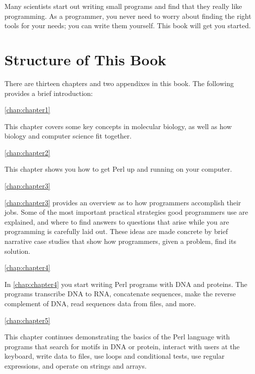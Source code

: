 Many scientists start out writing small programs and find that they really like programming. As a programmer, you never need to worry about finding the right tools for your needs; you can write them yourself. This book will get you started.

\section*{Structure of This Book}
There are thirteen chapters and two appendixes in this book. The following provides a brief introduction:

\autoref{chap:chapter1}
\begin{adjustwidth}{1cm}{0cm}
This chapter covers some key concepts in molecular biology, as well as how biology and computer science fit together.
\end{adjustwidth}

\autoref{chap:chapter2}
\begin{adjustwidth}{1cm}{0cm}
This chapter shows you how to get Perl up and running on your computer.
\end{adjustwidth}

\autoref{chap:chapter3}
\begin{adjustwidth}{1cm}{0cm}
\autoref{chap:chapter3} provides an overview as to how programmers accomplish their jobs. Some of the most important practical strategies good programmers use are explained, and where to find answers to questions that arise while you are programming is carefully laid out. These ideas are made concrete by brief narrative case studies that show how programmers, given a problem, find its solution.
\end{adjustwidth}

\autoref{chap:chapter4}
\begin{adjustwidth}{1cm}{0cm}
In \autoref{chap:chapter4} you start writing Perl programs with DNA and proteins. The programs transcribe DNA to RNA, concatenate sequences, make the reverse complement of DNA, read sequences data from files, and more.
\end{adjustwidth}

\autoref{chap:chapter5}
\begin{adjustwidth}{1cm}{0cm}
This chapter continues demonstrating the basics of the Perl language with programs that search for motifs in DNA or protein, interact with users at the keyboard, write data to files, use loops and conditional tests, use regular expressions, and operate on strings and arrays.
\end{adjustwidth}


